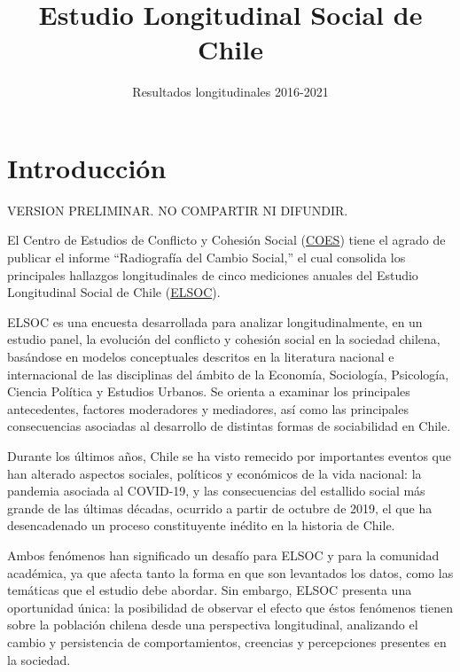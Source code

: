 \documentclass[
  12pt,
]{book}
\title{Estudio Longitudinal Social de Chile}
\subtitle{Resultados longitudinales 2016-2021}
\author{}
\date{\vspace{-2.5em}}
\begin{document}
\maketitle

{
\hypersetup{linkcolor=}
\setcounter{tocdepth}{1}
\tableofcontents
}
\listoftables
\listoffigures
{}
\hypertarget{introducciuxf3n}{%
\chapter*{Introducción}\label{introducciuxf3n}}

VERSION PRELIMINAR. NO COMPARTIR NI DIFUNDIR.

El Centro de Estudios de Conflicto y Cohesión Social (\href{https://coes.cl/}{COES}) tiene el agrado de publicar el informe ``Radiografía del Cambio Social,'' el cual consolida los principales hallazgos longitudinales de cinco mediciones anuales del Estudio Longitudinal Social de Chile (\href{https://coes.cl/encuesta-panel/}{ELSOC}).

ELSOC es una encuesta desarrollada para analizar longitudinalmente, en un estudio panel, la evolución del conflicto y cohesión social en la sociedad chilena, basándose en modelos conceptuales descritos en la literatura nacional e internacional de las disciplinas del ámbito de la Economía, Sociología, Psicología, Ciencia Política y Estudios Urbanos. Se orienta a examinar los principales antecedentes, factores moderadores y mediadores, así como las principales consecuencias asociadas al desarrollo de distintas formas de sociabilidad en Chile.

Durante los últimos años, Chile se ha visto remecido por importantes eventos que han alterado aspectos sociales, políticos y económicos de la vida nacional: la pandemia asociada al COVID-19, y las consecuencias del estallido social más grande de las últimas décadas, ocurrido a partir de octubre de 2019, el que ha desencadenado un proceso constituyente inédito en la historia de Chile.

Ambos fenómenos han significado un desafío para ELSOC y para la comunidad académica, ya que afecta tanto la forma en que son levantados los datos, como las temáticas que el estudio debe abordar. Sin embargo, ELSOC presenta una oportunidad única: la posibilidad de observar el efecto que éstos fenómenos tienen sobre la población chilena desde una perspectiva longitudinal, analizando el cambio y persistencia de comportamientos, creencias y percepciones presentes en la sociedad.
\end{document}
